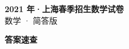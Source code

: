 \documentclass[zihao=-4, a4paper]{ctexart}
\begin{document}
\begin{center}
  {\Large\bfseries 2021 年·上海春季招生数学试卷}\\[4pt]
  {\large 数学 · 简答版}
\end{center}
\medskip
{}

\clearpage
{}
\begin{center}{\Large\bfseries 答案速查}\end{center}
\medskip

\end{document}
